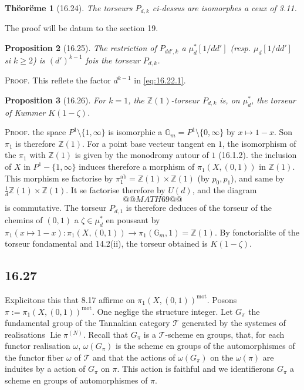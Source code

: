 \documentclass[12pt,a4paper]{article}
\theoremstyle{plain}
\newtheorem{theorem}{Th\"eor\"eme}[section]
\newtheorem{proposition}[theorem]{Proposition}
\theoremstyle{definition}
\theoremstyle{remark}
\DeclareMathOperator{\Lie}{Lie}
\newcommand{\mot}{\mathrm{mot}}
\newcommand{\Gm}{\mathbb{G}_m}
\newcommand{\ZZ}{\mathbb{Z}}
\begin{document}
\begin{theorem}[16.24]\label{thm:16.24}
The torseurs $P_{d,k}$ ci-dessus are isomorphes a ceux of 3.11.
\end{theorem}

The proof will be datum to the section 19.

\begin{proposition}[16.25]\label{prop:16.25}
The restriction of $P_{dd',k}$ a $\mu_d^*[1/dd']$ (resp.
$\mu_d[1/dd']$ si $k \geq 2$) is $(d')^{k-1}$ fois the torseur
$P_{d,k}$.
\end{proposition}

\noindent \textsc{Proof.} This reflete the factor $d^{k-1}$ in
\eqref{eq:16.22.1}.

\begin{proposition}[16.26]\label{prop:16.26}
For $k=1$, the $\ZZ(1)$-torseur $P_{d,k}$ is, on $\mu_d^*$, the
torseur of Kummer $K(1-\zeta)$.
\end{proposition}

\noindent \textsc{Proof.} the space $P^1 \setminus \{1,\infty\}$ is
isomorphic a $\Gm = P^1 \setminus \{0,\infty\}$ by $x \mapsto 1-x$.
Son $\pi_1$ is therefore $\ZZ(1)$. For a point base vecteur tangent en
$1$, the isomorphism of the $\pi_1$ with $\ZZ(1)$ is given by the
monodromy autour of $1$ (16.1.2). the inclusion of $X$ in
$P^1 - \{1,\infty\}$ induces therefore a morphism of $\pi_1(X,(0,1))$
in $\ZZ(1)$. This morphism se factorise by
$\pi_1^{\mathrm{ab}} = \ZZ(1) \times \ZZ(1)$ (by $p_0, p_1$), and
same by $\frac{1}{d}\ZZ(1) \times \ZZ(1)$. It se factorise therefore by
$U(d)$, and the diagram
\[
@@MATH69@@
\]
is commutative. The torseur $P_{d,1}$ is therefore deduces of the torseur of the
chemins of $(0,1)$ a $\zeta \in \mu_d^*$ en poussant by
$\pi_1(x \mapsto 1-x) : \pi_1(X,(0,1)) \to \pi_1(\Gm,1) = \ZZ(1)$. By
fonctorialite of the torseur fondamental and 14.2(ii), the torseur obtained
is $K(1-\zeta)$.

\subsection*{16.27}

Explicitons this that 8.17 affirme on $\pi_1(X,(0,1))^\mot$. Posons
$\pi := \pi_1(X,(0,1))^\mot$. One neglige the structure integer. Let
$G_\pi$ the fundamental group of the Tannakian category $\mathcal{T}$
generated by the systemes of realisations $\Lie \pi^{(N)}$.
Recall that $G_\pi$ is a $\mathcal{T}$-scheme en groups, that, for each functor realisation $\omega$, $\omega(G_\pi)$ is the scheme en
groups of the automorphismes of the functor fiber $\omega$ of $\mathcal{T}$ and that
the actions of $\omega(G_\pi)$ on the $\omega(\pi)$ are induites by a
action of $G_\pi$ on $\pi$. This action is faithful and we
identifierons $G_\pi$ a scheme en groups of automorphismes of
$\pi$.
\end{document}
